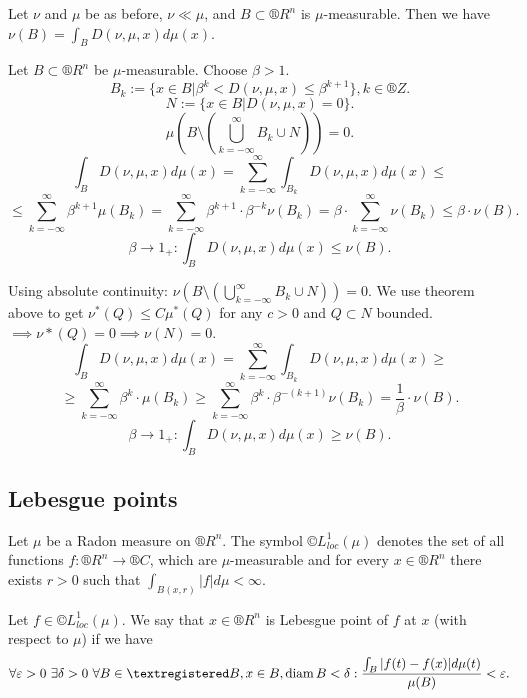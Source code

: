 \documentclass[12pt]{article}					%
\begin{document}
\begin{veta}
	Let $\nu$ and $\mu$ be as before, $\nu \ll \mu$, and $B \subset ®R^n$ is $\mu$-measurable. Then we have $\nu(B) = \int_B D(\nu, \mu, x) d\mu(x)$.

	\begin{dukazin}
		Let $B \subset ®R^n$ be $\mu$-measurable. Choose $\beta > 1$.
		$$ B_k := \{x \in B | \beta^k < D(\nu, \mu, x) ≤ \beta^{k + 1}\}, k \in ®Z. $$
		$$ N := \{x \in B | D(\nu, \mu, x) = 0\}. $$
		$$ \mu(B \setminus (\bigcup_{k=-∞}^∞ B_k \cup N)) = 0. $$
		$$ \int_B D(\nu, \mu, x) d\mu(x) = \sum_{k=-∞}^∞ \int_{B_k} D(\nu, \mu, x) d\mu(x) ≤ $$
		$$ ≤ \sum_{k=-∞}^∞ \beta^{k+1} \mu(B_k) = \sum_{k=-∞}^∞ \beta^{k + 1} · \beta^{-k} \nu(B_k) = \beta · \sum_{k=-∞}^∞ \nu(B_k) ≤ \beta · \nu(B). $$
		$$ \beta \rightarrow 1_+: \int_B D(\nu, \mu, x) d\mu(x) ≤ \nu(B). $$

		Using absolute continuity: $\nu(B \setminus (\bigcup_{k=-∞}^∞ B_k \cup N)) = 0$. We use theorem above to get $\nu^*(Q) ≤ C \mu^*(Q)$ for any $c > 0$ and $Q \subset N$ bounded. $\implies \nu*(Q) = 0 \implies \nu(N) = 0$.
		$$ \int_B D(\nu, \mu, x) d\mu(x) = \sum_{k=-∞}^∞ \int_{B_k} D(\nu, \mu, x) d\mu(x) ≥ $$
		$$ ≥ \sum_{k=-∞}^∞ \beta^k · \mu(B_k) ≥ \sum_{k=-∞}^∞ \beta^k · \beta^{-(k+1)} \nu(B_k) = \frac{1}{\beta}·\nu(B). $$
		$$ \beta \rightarrow 1_+: \int_B D(\nu, \mu, x) d\mu(x) ≥ \nu(B). $$	
	\end{dukazin}
\end{veta}


\subsection{Lebesgue points}
\begin{definice}[$©L_{loc}^1$]
	Let $\mu$ be a Radon measure on $®R^n$. The symbol $©L_{loc}^1(\mu)$ denotes the set of all functions $f: ®R^n \rightarrow ®C$, which are $\mu$-measurable and for every $x \in ®R^n$ there exists $r > 0$ such that $\int_{B(x, r)} |f| d\mu < ∞$.
\end{definice}

\begin{definice}
	Let $f \in ©L_{loc}^1(\mu)$. We say that $x \in ®R^n$ is Lebesgue point of $f$ at $x$ (with respect to $\mu$) if we have
	$$ \forall \epsilon > 0\ \exists \delta > 0\ \forall B \in ®B, x \in B, \diam B < \delta: \frac{\int_B |f(t) - f(x)| d\mu(t)}{\mu(B)} < \epsilon. $$
\end{definice}
\end{document}
